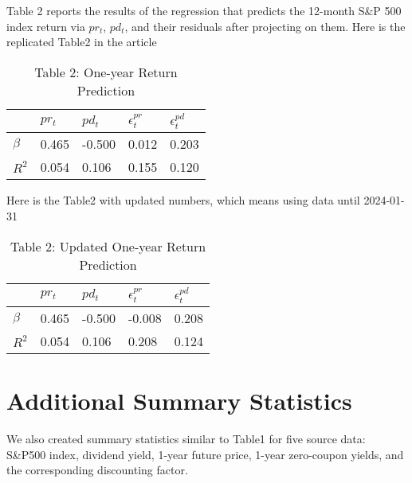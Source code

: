 \documentclass{article}
\begin{document}
Table 2 reports the results of the regression that predicts 
the 12-month S\&P 500 index return via \( pr_t \), \( pd_t \), and their 
residuals after projecting on them. 
\newline
\newline
Here is the replicated Table2 in the article
\begin{table}[H]
\centering
\begin{tabular}{lllll}
    \toprule
     & $pr_t$ & $pd_t$ & $\epsilon^{pr}_t$ & $\epsilon^{pd}_t$ \\
    \midrule
    $\beta$ & 0.465 & -0.500 & 0.012 & 0.203 \\
    $R^2$ & 0.054 & 0.106 & 0.155 & 0.120 \\
    \bottomrule
\end{tabular}
\caption*{Table 2: One-year Return Prediction}
\label{tab:your_label}
\end{table}    

Here is the Table2 with updated numbers, which means using data until 2024-01-31
\begin{table}[H]
    \centering
    \begin{tabular}{lllll}
        \toprule
         & $pr_t$ & $pd_t$ & $\epsilon^{pr}_t$ & $\epsilon^{pd}_t$ \\
        \midrule
        $\beta$ & 0.465 & -0.500 & -0.008 & 0.208 \\
        $R^2$ & 0.054 & 0.106 & 0.208 & 0.124 \\
        \bottomrule
    \end{tabular}
    \caption*{Table 2: Updated One-year Return Prediction}
    \label{tab:your_label}
    \end{table}   


\section{Additional Summary Statistics}
We also created summary statistics similar to Table1 for five source data: 
S\&P500 index, dividend yield, 1-year future price, 1-year 
zero-coupon yields, and the corresponding discounting factor.
\end{document}
